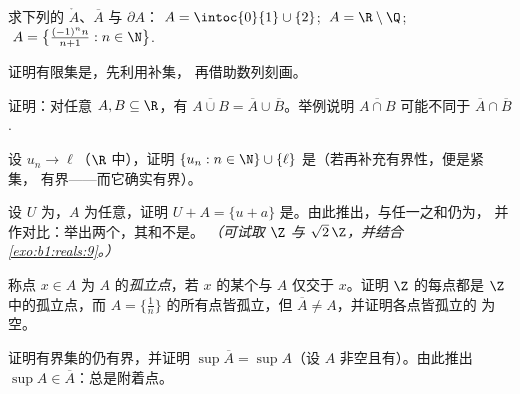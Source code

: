 \begin{exercise}[$\star$]\label{exo:b1:topology:2}
求下列的 $\mathring A$、$\overline A$ 与 $\partial A$：
$A = \intoc{0}{1} \cup \{2\}$; $\;A = \R \setminus \Q$;
$\;A = \bigl\{\frac{(-1)^n n}{n+1} : n \in \N\bigr\}$.
\end{exercise}

\begin{exercise}[$\star$]\label{exo:b1:topology:3}
证明有限集是，先利用补集，
再借助数列刻画。
\end{exercise}

\begin{exercise}[$\star$]\label{exo:b1:topology:4}
证明：对任意 $A, B \subseteq \R$，有 $\overline{A \cup B} =
\overline A \cup \overline B$。举例说明
$\overline{A \cap B}$ 可能不同于 $\overline A \cap \overline
B$.
\end{exercise}

\begin{exercise}[$\star\star$]\label{exo:b1:topology:5}
设 $u_n \to \ell$（$\R$ 中），证明 $\{u_n : n \in \N\}
\cup \{\ell\}$ 是（若再补充有界性，便是紧集，
  有界——而它确实有界）。
\end{exercise}

\begin{exercise}[$\star\star$]\label{exo:b1:topology:6}
设 $U$ 为，$A$ 为任意，证明 $U + A = \{u + a\}$
是。由此推出，与任一之和仍为，
并作对比：举出两个\emph{}，其和不是。
\emph{（可试取 $\Z$ 与 $\sqrt 2\,\Z$，并结合\cref{exo:b1:reals:9}。）}
\end{exercise}

\begin{exercise}[$\star\star$]\label{exo:b1:topology:7}
称点 $x \in A$ 为 $A$ 的\emph{孤立点}，若
$x$ 的某个与 $A$ 仅交于 $x$。证明 $\Z$ 的每点都是
$\Z$ 中的孤立点，而 $A = \{\frac1n\}$ 的所有点皆孤立，但
$\overline A \neq A$，并证明各点皆孤立的
为空。
\end{exercise}

\begin{exercise}[$\star\star$]\label{exo:b1:topology:8}
证明有界集的仍有界，并证明
$\sup \overline A = \sup A$（设 $A$ 非空且有）。由此推出
$\sup A \in \overline A$：总是附着点。
\end{exercise}


